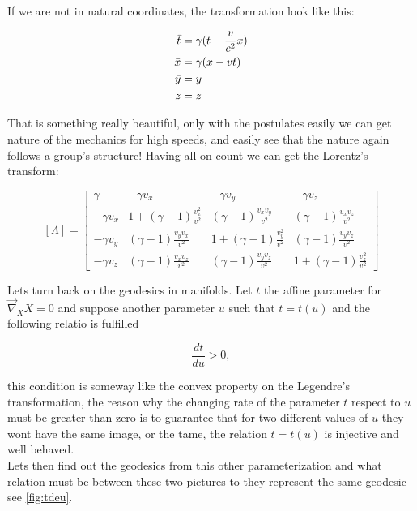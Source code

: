         If we are not in natural coordinates, the transformation look like this:
        
        \begin{align*}
            \Bar{t} &= \gamma(t-\frac{v}{c^2}x)\\
            \Bar{x} &= \gamma(x-vt)\\
            \Bar{y} &= y\\
            \Bar{z} &= z
        \end{align*}
        
        That is something really beautiful, only with the postulates easily we can get nature of the mechanics for high speeds, and easily see that the nature again follows a group's structure! Having all on count we can get the Lorentz's transform:
        
        \begin{equation}\label{eq:GLT}
            [\Lambda] =
            \begin{bmatrix}
            \gamma & -\gamma v_x & -\gamma v_y & -\gamma v_z\\
            -\gamma v_x & 1+(\gamma - 1)\frac{v_x^2}{v^2} & (\gamma - 1)\frac{v_xv_y}{v^2} & (\gamma-1)\frac{v_xv_z}{v^2}\\
            -\gamma v_y & (\gamma - 1)\frac{v_yv_x}{v^2} & 1 + (\gamma - 1)\frac{v_y^2}{v^2} & (\gamma-1)\frac{v_yv_z}{v^2}\\
            -\gamma v_z & (\gamma-1)\frac{v_xv_z}{v^2} & (\gamma-1)\frac{v_yv_z}{v^2} & 1 +(\gamma - 1)\frac{v_z^2}{v^2}
            \end{bmatrix}
        \end{equation}


    Lets turn back on the geodesics in manifolds. Let $t$ the affine parameter for $\Vec{\nabla}_XX=0$ and suppose another parameter $u$ such that $t = t(u)$ and the following relatio is fulfilled

    \begin{equation}
        \frac{dt}{du}>0,
    \end{equation}

    this condition is someway like the convex property on the Legendre's transformation, the reason why the changing rate of the parameter $t$ respect to $u$ must be greater than zero is to guarantee that for two different values of $u$ they wont have the same image, or the tame, the relation $t=t(u)$ is injective and well behaved.\\

    Lets then find out the geodesics from this other parameterization and what relation must be between these two pictures to they represent the same geodesic see \ref{fig:tdeu}.


